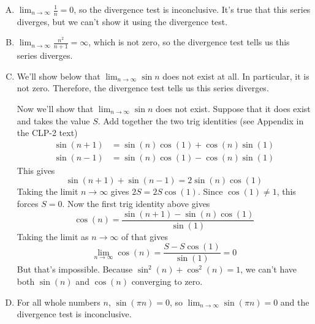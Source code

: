\begin{solution}
\begin{enumerate}[(A)]
\item $\displaystyle\lim_{n \to \infty}\frac{1}{n}=0$, so the divergence test is inconclusive. It's true that this series diverges, but we can't show it using the divergence test.
\item $\displaystyle\lim_{n \to \infty}\frac{n^2}{n+1}=\infty$, which is not zero, so the divergence test tells us this series diverges.
\item 
We'll show below that $\displaystyle\lim_{n \to \infty}\sin n$ does not exist
at all. In particular, it is not zero. Therefore, the divergence test tells us this series diverges.

Now we'll show that $\displaystyle\lim_{n \to \infty}\sin n$ does not exist.
Suppose that it does exist and takes the value $S$. Add together the two 
trig identities (see Appendix  in the CLP-2 text) 
\begin{align*}
\sin(n+1)  &=  \sin(n)\cos(1)+\cos(n)\sin(1) \\
\sin(n-1)  &=  \sin(n)\cos(1)-\cos(n)\sin(1) 
\end{align*}
This gives 
\begin{equation*}
\sin(n+1) +\sin (n-1) = 2\sin(n)\cos(1)
\end{equation*}
Taking the limit $n\rightarrow\infty$ gives $2S=2S\cos(1)$. Since $\cos(1)\ne 1$,
this forces $S=0$. Now the first trig identity above gives
\begin{equation*}
\cos(n)  =  \frac{\sin(n+1)-\sin(n)\cos(1)}{\sin(1)}
\end{equation*}
Taking the limit as $n\rightarrow\infty$ of that gives
\begin{equation*}
\lim_{n\to\infty}\cos(n)  =  \frac{S-S\cos(1)}{\sin(1)}=0
\end{equation*}
But that's impossible. Because $\sin^2(n)+\cos^2(n)=1$, we can't have both $\sin(n)$ and $\cos(n)$ converging to zero.

\item For all whole numbers $n$, $\sin(\pi n)=0$, so $\displaystyle\lim_{n \to \infty}\sin(\pi n)=0$ and the divergence test is inconclusive.
\end{enumerate}
\end{solution}


